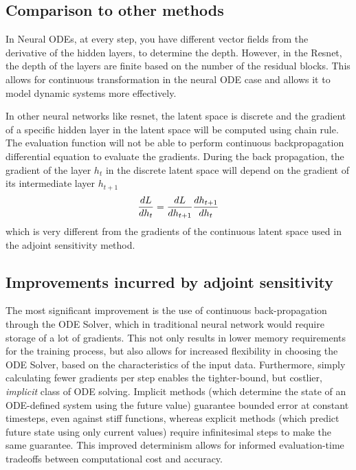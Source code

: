 \documentclass{article}
\begin{document}
\subsection{Comparison to other methods} 
 

In Neural ODEs, at every step, you have different vector fields from the derivative of the hidden layers, to determine the depth. However, in the Resnet, the depth of the layers are finite based on the number of the residual blocks. This allows for continuous transformation in the neural ODE case and allows it to model dynamic systems more effectively.



In other neural networks like resnet, the latent space is discrete and the gradient of a specific hidden layer in the latent space will be computed using chain rule. The evaluation function will not be able to perform continuous backpropagation differential equation to evaluate the gradients. During the back propagation, the gradient of the layer $h_t$ in the discrete latent space will depend on the gradient of its intermediate layer $h_{t+1}$
\begin{equation}
    \vspace{-1mm}
    \frac{dL}{dh_t} = \frac{dL}{dh_{t+1}}\frac{dh_{t+1}}{dh_t}
\end{equation}
which is very different from the gradients of the continuous latent space used in the adjoint sensitivity method.

\subsection{Improvements incurred by adjoint sensitivity}
The most significant improvement is the use of continuous back-propagation through the ODE Solver, which in traditional neural network would require storage of a lot of gradients. This not only results in lower memory requirements for the training process, but also allows for increased flexibility in choosing the ODE Solver, based on the characteristics of the input data. Furthermore, simply calculating fewer gradients per step enables the tighter-bound, but costlier, \emph{implicit} class of ODE solving. Implicit methods (which determine the state of an ODE-defined system using the future value) guarantee bounded error at constant timesteps, even against stiff functions, whereas explicit methods (which predict future state using only current values) require infinitesimal steps to make the same guarantee. This improved determinism allows for informed evaluation-time tradeoffs between computational cost and accuracy.
\end{document}
